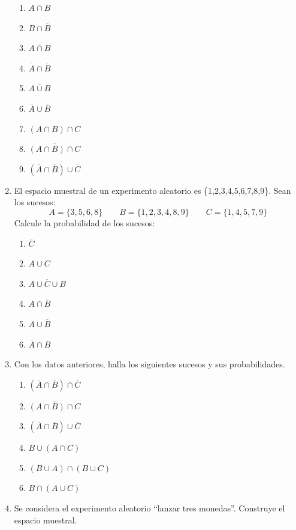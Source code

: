 \documentclass[10pt,twoside]{article}
\begin{document}
\begin{enumerate}
\begin{multicols}{3}
\begin{enumerate}
    \item $ A\cap B $
    \item $ B\cap \overline{B} $
    \item $ \overline{A\cap B} $
    \item $ \overline{A}\cap \overline{B} $
    \item $ \overline{A\cup B} $
    \item $ \overline{A}\cup \overline{B} $
    \item $ (A\cap B)\cap C $
    \item $ \overline{(A\cap B)\cap C} $
    \item $ (\overline{A}\cap\overline{B})\cup\overline{C} $
  \end{enumerate}
\end{multicols}
\item El espacio muestral de un experimento aleatorio es  \{1,2,3,4,5,6,7,8,9\}. Sean los sucesos:
\[ A=\{3,5,6,8\}\qquad B=\{1,2,3,4,8,9\}\qquad C=\{1,4,5,7,9\} \]
Calcule la probabilidad de los sucesos:
\begin{multicols}{3}
  \begin{enumerate}
    \item $ \overline{C} $
    \item $ A\cup C $
    \item $ A\cup\overline{C}\cup B $
    \item $ A\cap\overline{B} $
    \item $ A\cup\overline{B} $
    \item $ \overline{A}\cap B $
  \end{enumerate}
\end{multicols}
\item Con los datos anteriores, halla los siguientes sucesos y sus probabilidades.
\begin{multicols}{2}
  \begin{enumerate}
    \item $ (\overline{A}\cap\overline{B})\cap\overline{C} $
    \item $ \overline{(A\cap B)\cap C} $
    \item $ (\overline{A}\cap\overline{B})\cup\overline{C} $
    \item $ B\cup(A\cap C) $
    \item $ (B\cup A)\cap(B\cup C) $
    \item $ B\cap (A\cup C) $
  \end{enumerate}
\end{multicols}
\item Se considera el experimento aleatorio “lanzar tres monedas”. Construye el espacio muestral.

\end{enumerate}
\end{document}
